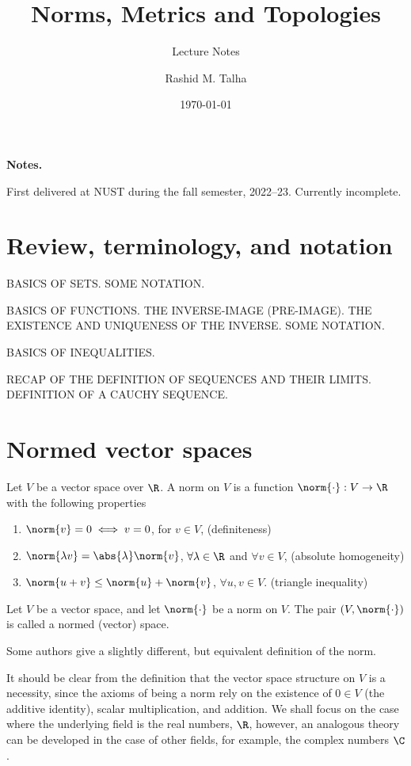 \documentclass[draft]{penrose}
\title{Norms, Metrics and Topologies}
\subtitle{Lecture Notes}
\author{Rashid M. Talha}
\affiliation{School of Natural Sciences, NUST}
\date{\today}
\begin{document}
\maketitle
\begin{center}
  \textbf{Notes.}\par
  First delivered at NUST during the fall semester, 2022--23. Currently incomplete.
\end{center}

\section{Review, terminology, and notation}
BASICS OF SETS. SOME NOTATION.

BASICS OF FUNCTIONS. THE INVERSE-IMAGE (PRE-IMAGE). THE EXISTENCE AND UNIQUENESS OF THE INVERSE. SOME NOTATION.

BASICS OF INEQUALITIES.

RECAP OF THE DEFINITION OF SEQUENCES AND THEIR LIMITS. DEFINITION OF A CAUCHY SEQUENCE.

\section{Normed vector spaces}
\begin{ndfn}[Norm]
  Let $V$ be a vector space over $\R$. A norm on $V$ is a function $\norm{\cdot}:V\to\R$ with the following properties
  \begin{enumerate}
  \item $\norm{v} = 0 \iff v =0$, for $v \in V$, \hfill (definiteness)
  \item $\norm{\lambda v} = \abs{\lambda}\norm{v}$, $\forall \lambda \in \R$ and $\forall v \in V$, \hfill (absolute homogeneity)
  \item $\norm{u+v} \leq \norm{u} + \norm{v}$, $\forall u,v \in V$. \hfill (triangle inequality)
  \end{enumerate}
\end{ndfn}

\begin{ndfn}
  Let $V$ be a vector space, and let $\norm{\cdot}$ be a norm on $V$. The pair $(V, \norm{\cdot})$ is called a normed (vector) space.
\end{ndfn}

Some authors give a slightly different, but equivalent definition of the norm.

It should be clear from the definition that the vector space structure on $V$ is a necessity, since the axioms of being a norm rely on the existence of $0 \in V$ (the additive identity), scalar multiplication, and addition. We shall focus on the case where the underlying field is the real numbers, $\R$, however, an analogous theory can be developed in the case of other fields, for example, the complex numbers $\C$.
\end{document}
